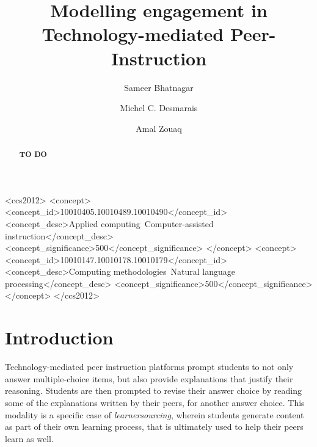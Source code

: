 \documentclass[sigconf]{acmart}
\begin{document}
\title{Modelling engagement in Technology-mediated 
Peer-Instruction}

\author{Sameer Bhatnagar}
\author{Michel C. Desmarais}
\author{Amal Zouaq}


\renewcommand{\shortauthors}{Bhatnagar, et al.}

\begin{abstract}
\textbf{TO DO}
\end{abstract}


\begin{CCSXML}
	<ccs2012>
	<concept>
	<concept_id>10010405.10010489.10010490</concept_id>
	<concept_desc>Applied 
	computing~Computer-assisted 
	instruction</concept_desc>
	<concept_significance>500</concept_significance>
	</concept>
	<concept>
	<concept_id>10010147.10010178.10010179</concept_id>
	<concept_desc>Computing methodologies~Natural 
	language processing</concept_desc>
	<concept_significance>500</concept_significance>
	</concept>
	</ccs2012>
\end{CCSXML}





\maketitle

\section{Introduction}

Technology-mediated peer instruction platforms 
\cite{univeristy_of_british_columbia_ubc/ubcpi_2019}\cite{charles_harnessing_2019}
prompt students to not only answer multiple-choice 
items, but also provide 
explanations that justify their reasoning. 
Students are then prompted to revise their answer 
choice by reading some of the 
explanations written by their peers, for another 
answer choice.
This modality is a specific case of 
\textit{learnersourcing}\cite{weir_learnersourcing_2015},
 wherein students 
generate content as part of their own learning 
process, that is ultimately 
used to help their peers learn as well. 
\end{document}

